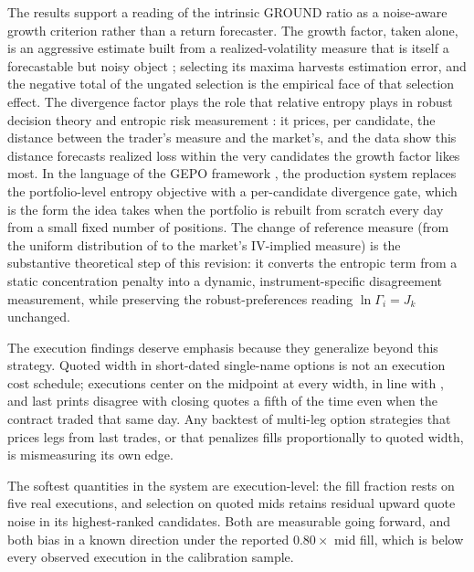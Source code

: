 \documentclass[11pt]{article}
\begin{document}
The results support a reading of the intrinsic GROUND ratio as a noise-aware
growth criterion rather than a return forecaster. The growth factor, taken
alone, is an aggressive estimate built from a realized-volatility measure
that is itself a forecastable but noisy object \cite{andersen2003,
christensen1998}; selecting its maxima harvests estimation error, and the
negative total of the ungated selection is the empirical face of that
selection effect. The divergence factor plays the role that relative entropy
plays in robust decision theory \cite{hansensargent2008} and entropic risk
measurement \cite{follmer2002}: it prices, per candidate, the distance
between the trader's measure and the market's, and the data show this
distance forecasts realized loss within the very candidates the growth factor
likes most. In the language of the GEPO framework \cite{mercurio2020gepo},
the production system replaces the portfolio-level entropy objective with a
per-candidate divergence gate, which is the form the idea takes when the
portfolio is rebuilt from scratch every day from a small fixed number of
positions. The change of reference measure (from the uniform distribution of
\cite{mercurio2020binary, mercurio2020gepo} to the market's IV-implied
measure) is the substantive theoretical step of this revision: it converts
the entropic term from a static concentration penalty into a dynamic,
instrument-specific disagreement measurement, while preserving the
robust-preferences reading $\ln\Gamma_i = J_k$ \cite{hansensargent2008,
maccheroni2006} unchanged.

The execution findings deserve emphasis because they generalize beyond this
strategy. Quoted width in short-dated single-name options is not an execution
cost schedule; executions center on the midpoint at every width, in line with
\cite{muravyev2020}, and last prints disagree with closing quotes a fifth of
the time even when the contract traded that same day. Any backtest of
multi-leg option strategies that prices legs from last trades, or that
penalizes fills proportionally to quoted width, is mismeasuring its own edge.

The softest quantities in the system are execution-level: the fill fraction
rests on five real executions, and selection on quoted mids retains residual
upward quote noise in its highest-ranked candidates. Both are measurable
going forward, and both bias in a known direction under the reported
$0.80\times$ mid fill, which is below every observed execution in the
calibration sample.
\end{document}
